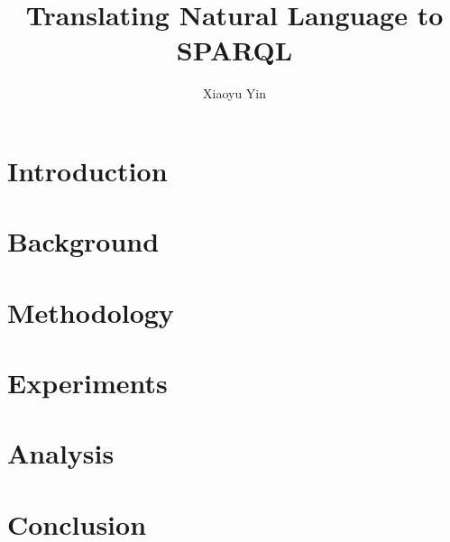 \documentclass[hyperref, lof, lot, noproblem, masterofscience]{cgvpub}
\author{Xiaoyu Yin}
\title{Translating Natural Language to SPARQL}
\begin{document}
\chapter{Introduction}




\chapter{Background}





\chapter{Methodology}




\chapter{Experiments}




\chapter{Analysis}




\chapter{Conclusion}


\end{document}
